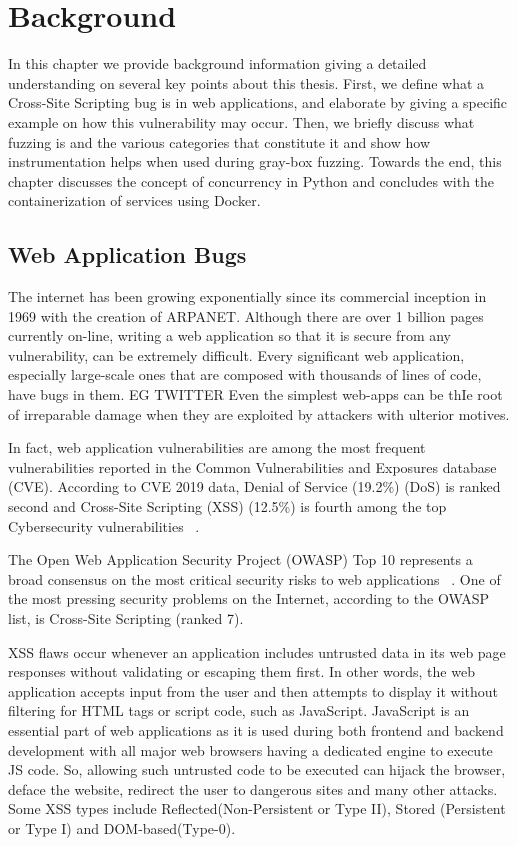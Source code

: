 \chapter{Background}
\label{sec:background}
\minitoc
\vspace*{1cm}

In this chapter we provide background information giving a detailed understanding on several key points about this thesis. First, we define what a Cross-Site Scripting bug is in web applications, and elaborate by giving a specific example on how this vulnerability may occur. Then, we briefly discuss what fuzzing is and the various categories that constitute it and show how instrumentation helps when used during gray-box fuzzing. Towards the end, this chapter discusses the concept of concurrency in Python and concludes with the containerization of services using Docker.

\section{Web Application Bugs}
The internet has been growing exponentially since its commercial inception in 1969 with the creation of ARPANET. Although there are over 1 billion pages currently on-line, writing a web application so that it is secure from any vulnerability, can be extremely difficult. Every significant web application, especially large-scale ones that are composed with thousands of lines of code, have bugs in them. EG TWITTER Even the simplest web-apps can be thIe root of irreparable damage when they are exploited by attackers with ulterior motives. 

In fact, web application vulnerabilities are among the most frequent vulnerabilities reported in the Common Vulnerabilities and Exposures database (CVE). According to CVE 2019 data, Denial of Service (19.2\%) (DoS) is ranked second and Cross-Site Scripting (XSS) (12.5\%) is fourth among the top Cybersecurity vulnerabilities ~\cite{cve}.

The Open Web Application Security Project (OWASP) Top 10 represents a broad consensus on the most critical security risks to web applications ~\cite{owasp2017}. One of the most pressing security problems on the Internet, according to the OWASP list, is Cross-Site Scripting (ranked 7).

XSS flaws occur whenever an application includes untrusted data in its web page responses without validating or escaping them first. In other words, the web application accepts input from the user and then attempts to display it without filtering for HTML tags or script code, such as JavaScript. JavaScript is an essential part of web applications as it is used during both frontend and backend development with all major web browsers having a dedicated engine to execute JS code. So, allowing such untrusted code to be executed can hijack the browser, deface the website, redirect the user to dangerous sites and many other attacks. Some XSS types include Reflected(Non-Persistent or Type II), Stored (Persistent or Type I) and DOM-based(Type-0).


